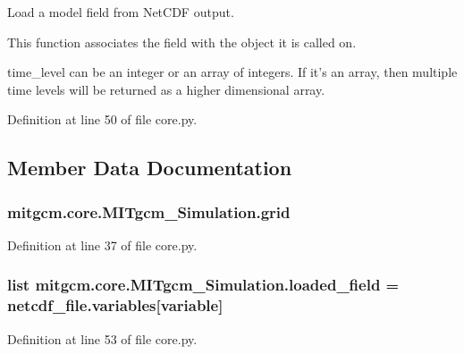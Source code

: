 Load a model field from Net\+C\+D\+F output. 

This function associates the field with the object it is called on.

time\+\_\+level can be an integer or an array of integers. If it's an array, then multiple time levels will be returned as a higher dimensional array. 

Definition at line 50 of file core.\+py.



\subsection{Member Data Documentation}
\hypertarget{classmitgcm_1_1core_1_1MITgcm__Simulation_a984db65a189bf843e988079f724cdee3}{
\subsubsection[{grid}]{\setlength{\rightskip}{0pt plus 5cm}mitgcm.\+core.\+M\+I\+Tgcm\+\_\+\+Simulation.\+grid}}\label{classmitgcm_1_1core_1_1MITgcm__Simulation_a984db65a189bf843e988079f724cdee3}


Definition at line 37 of file core.\+py.

\hypertarget{classmitgcm_1_1core_1_1MITgcm__Simulation_ad50484938272dfc5107b0af495443d25}{
\subsubsection[{loaded\+\_\+field}]{\setlength{\rightskip}{0pt plus 5cm}list mitgcm.\+core.\+M\+I\+Tgcm\+\_\+\+Simulation.\+loaded\+\_\+field = netcdf\+\_\+file.\+variables\mbox{[}variable\mbox{]}\hspace{0.3cm}{\ttfamily [static]}}}\label{classmitgcm_1_1core_1_1MITgcm__Simulation_ad50484938272dfc5107b0af495443d25}


Definition at line 53 of file core.\+py.

